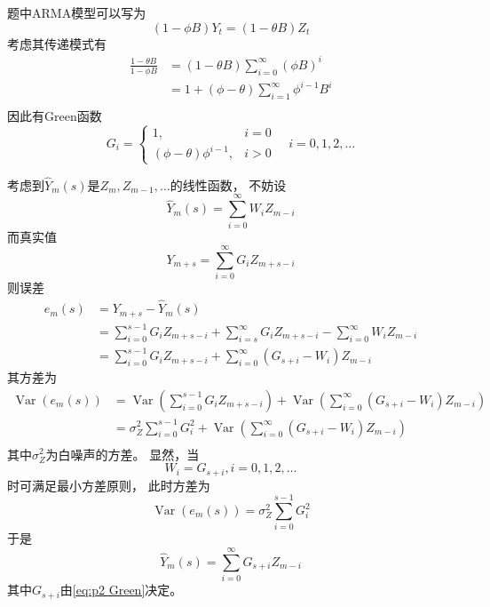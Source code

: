 \documentclass[cn]{homework}
\DeclareMathOperator{\var}{Var}
\begin{document}
    \problem
    \begin{subproblem}[(\alph*)]
        \item
        题中ARMA模型可以写为
        \[(1-\phi B)Y_t=(1-\theta B)Z_t\]
        考虑其传递模式有
        \[\begin{aligned}
            \frac{1-\theta B}{1-\phi B}
            &=(1-\theta B)\sum_{i=0}^\infty(\phi B)^i\\
            &=1+(\phi-\theta)\sum_{i=1}^\infty\phi^{i-1}B^i\\
        \end{aligned}\]
        因此有Green函数
        \begin{equation}
            \label{eq:p2 Green}
            G_i=\begin{cases}
            1,&i=0\\
            (\phi-\theta)\phi^{i-1},&i>0
            \end{cases}\quad i=0,1,2,\ldots
        \end{equation}

        考虑到$\hat Y_m(s)$是$Z_m,Z_{m-1},\ldots$的线性函数，
        不妨设
        \[\hat Y_m(s)=\sum_{i=0}^\infty W_iZ_{m-i}\]
        而真实值
        \[Y_{m+s}=\sum_{i=0}^\infty G_iZ_{m+s-i}\]
        则误差
        \[\begin{aligned}
           e_m(s)&=Y_{m+s}-\hat Y_m(s)\\ 
           &=\sum_{i=0}^{s-1}G_iZ_{m+s-i}
             +\sum_{i=s}^\infty G_iZ_{m+s-i}
             -\sum_{i=0}^\infty W_iZ_{m-i}\\
           &=\sum_{i=0}^{s-1}G_iZ_{m+s-i}
             +\sum_{i=0}^\infty (G_{s+i}-W_i)Z_{m-i}
        \end{aligned}\]
        其方差为
        \[\begin{aligned}
            \var(e_m(s))&=\var\left(\sum_{i=0}^{s-1}G_iZ_{m+s-i}\right)
            +\var\left(\sum_{i=0}^\infty (G_{s+i}-W_i)Z_{m-i}\right)\\
            &=\sigma_Z^2\sum_{i=0}^{s-1}G_i^2
              +\var\left(\sum_{i=0}^\infty (G_{s+i}-W_i)Z_{m-i}\right)\\
        \end{aligned}\]
        其中$\sigma_Z^2$为白噪声的方差。
        显然，当
        \[W_i=G_{s+i},i=0,1,2,\ldots\]
        时可满足最小方差原则，
        此时方差为
        \begin{equation}
            \label{eq:p2 variance}
            \var(e_m(s))=\sigma_Z^2\sum_{i=0}^{s-1}G_i^2
        \end{equation}
        于是
        \[\hat Y_m(s)=\sum_{i=0}^\infty G_{s+i}Z_{m-i}\]
        其中$G_{s+i}$由\cref{eq:p2 Green}决定。


\end{subproblem}
\end{document}
